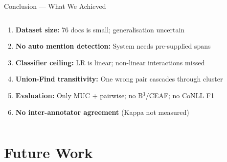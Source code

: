 \documentclass[aspectratio=169]{beamer}
\begin{document}
\begin{frame}{Conclusion — What We Achieved}
\begin{columns}[T]
      \begin{tcolorbox}[wbox={Limitations (Honestly Reported)}]
        \small
        \begin{enumerate}\setlength\itemsep{4pt}
          \item \textbf{Dataset size:} 76 docs is small;
                generalisation uncertain
          \item \textbf{No auto mention detection:}
                System needs pre-supplied spans
          \item \textbf{Classifier ceiling:}
                LR is linear; non-linear interactions missed
          \item \textbf{Union-Find transitivity:}
                One wrong pair cascades through cluster
          \item \textbf{Evaluation:} Only MUC $+$ pairwise;
                no B$^3$/CEAF; no CoNLL F1
          \item \textbf{No inter-annotator agreement}
                (Kappa not measured)
        \end{enumerate}
      \end{tcolorbox}
  \end{columns}
\end{frame}

\section{Future Work}
\end{document}
